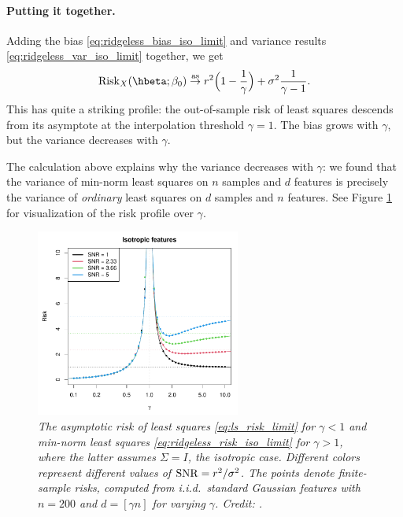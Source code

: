 \documentclass{article}
\begin{document}
\paragraph{Putting it together.}

Adding the bias \eqref{eq:ridgeless_bias_iso_limit} and variance results
\eqref{eq:ridgeless_var_iso_limit} together, we get
\begin{equation}
\label{eq:ridgeless_risk_iso_limit}
\Risk_X(\hbeta; \beta_0) \asto r^2 \Big( 1- \frac{1}{\gamma} \Big) + \sigma^2 
\frac{1}{\gamma-1}. 
\end{equation}
This has quite a striking profile: the out-of-sample risk of least squares
descends from its asymptote at the interpolation threshold $\gamma = 1$. The
bias grows with $\gamma$, but  the variance decreases with $\gamma$.     

The calculation above explains why the variance decreases with $\gamma$: we
found that the variance of min-norm least squares on $n$ samples and $d$
features is precisely the variance of \emph{ordinary} least squares on $d$
samples and $n$ features. See Figure \ref{fig:risk_iso} for visualization of the
risk profile over $\gamma$.

\begin{figure}[htb]
\centering
\includegraphics[width=0.6\textwidth]{risk_iso.pdf}
\caption{\it The asymptotic risk of least squares \eqref{eq:ls_risk_limit} for
  $\gamma<1$ and min-norm least squares \eqref{eq:ridgeless_risk_iso_limit} for 
  $\gamma>1$, where the latter assumes $\Sigma = I$, the isotropic case.
  Different colors represent different values of $\mathrm{SNR} = r^2 / \sigma^2$. The
  points denote finite-sample risks, computed from i.i.d.\ standard Gaussian
  features with $n=200$ and $d=[\gamma n]$ for varying $\gamma$. Credit:
  \citet{hastie2022surprises}.}   
\label{fig:risk_iso}
\end{figure}
\end{document}
